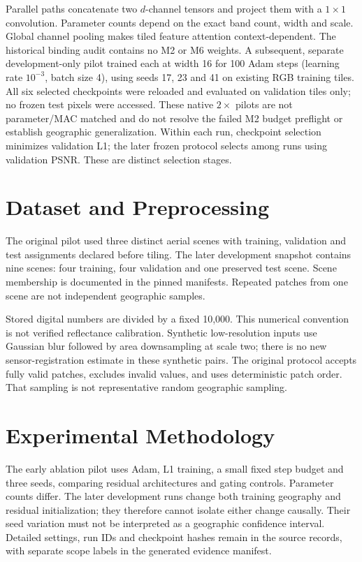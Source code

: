 \documentclass[conference]{IEEEtran}
\begin{document}
Parallel paths concatenate two $d$-channel tensors and project them with a $1\times1$ convolution. Parameter counts depend on the exact band count, width and scale. Global channel pooling makes tiled feature attention context-dependent. The historical binding audit contains no M2 or M6 weights. A subsequent, separate development-only pilot trained each at width 16 for 100 Adam steps (learning rate $10^{-3}$, batch size 4), using seeds 17, 23 and 41 on existing RGB training tiles. All six selected checkpoints were reloaded and evaluated on validation tiles only; no frozen test pixels were accessed. These native $2\times$ pilots are not parameter/MAC matched and do not resolve the failed M2 budget preflight or establish geographic generalization. Within each run, checkpoint selection minimizes validation L1; the later frozen protocol selects among runs using validation PSNR. These are distinct selection stages.


\section{Dataset and Preprocessing}
The original pilot used three distinct aerial scenes with training, validation and test assignments declared before tiling. The later development snapshot contains nine scenes: four training, four validation and one preserved test scene. Scene membership is documented in the pinned manifests. Repeated patches from one scene are not independent geographic samples.

Stored digital numbers are divided by a fixed 10,000. This numerical convention is not verified reflectance calibration. Synthetic low-resolution inputs use Gaussian blur followed by area downsampling at scale two; there is no new sensor-registration estimate in these synthetic pairs. The original protocol accepts fully valid patches, excludes invalid values, and uses deterministic patch order. That sampling is not representative random geographic sampling.
\section{Experimental Methodology}
The early ablation pilot uses Adam, L1 training, a small fixed step budget and three seeds, comparing residual architectures and gating controls. Parameter counts differ. The later development runs change both training geography and residual initialization; they therefore cannot isolate either change causally. Their seed variation must not be interpreted as a geographic confidence interval. Detailed settings, run IDs and checkpoint hashes remain in the source records, with separate scope labels in the generated evidence manifest.
\end{document}
